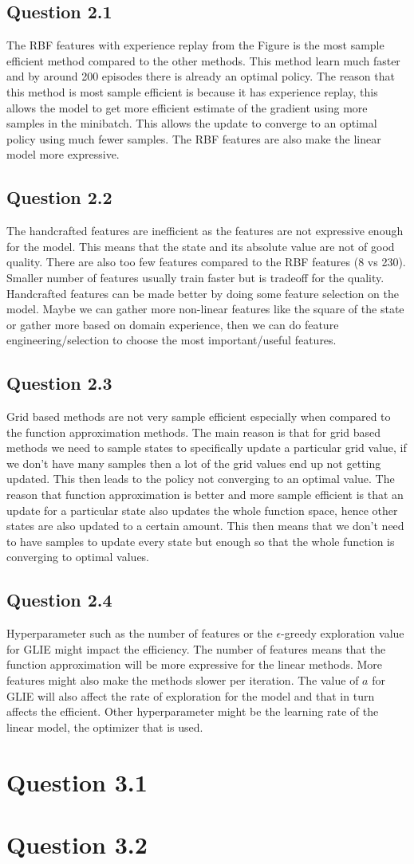 \documentclass[a4paper]{article}
\begin{document}
\subsection*{Question 2.1}
The RBF features with experience replay from the Figure is the most sample efficient method compared to the other methods. This method learn much faster and by around 200 episodes there is already an optimal policy. The reason that this method is most sample efficient is because it has experience replay, this allows the model to get more efficient estimate of the gradient using more samples in the minibatch. This allows the update to converge to an optimal policy using much fewer samples. The RBF features are also make the linear model more expressive.  
\subsection*{Question 2.2}
The handcrafted features are inefficient as the features are not expressive enough for the model. This means that the state and its absolute value are not of good quality. There are also too few features compared to the RBF features (8 vs 230). Smaller number of features usually train faster but is tradeoff for the quality. Handcrafted features can be made better by doing some feature selection on the model. Maybe we can gather more non-linear features like the square of the state or gather more based on domain experience, then we can do feature engineering/selection to choose the most important/useful features.
\subsection*{Question 2.3}
Grid based methods are not very sample efficient especially when compared to the function approximation methods. The main reason is that for grid based methods we need to sample states to specifically update a particular grid value, if we don't have many samples then a lot of the grid values end up not getting updated. This then leads to the policy not converging to an optimal value. The reason that function approximation is better and more sample efficient is that an update for a particular state also updates the whole function space, hence other states are also updated to a certain amount. This then means that we don't need to have samples to update every state but enough so that the whole function is converging to optimal values.
\subsection*{Question 2.4}
Hyperparameter such as the number of features or the $\epsilon$-greedy exploration value for GLIE might impact the efficiency. The number of features means that the function approximation will be more expressive for the linear methods. More features might also make the methods slower per iteration. The value of $a$ for GLIE will also affect the rate of exploration for the model and that in turn affects the efficient. Other hyperparameter might be the learning rate of the linear model, the optimizer that is used.
\section*{Question 3.1}
\section*{Question 3.2}
\end{document}
